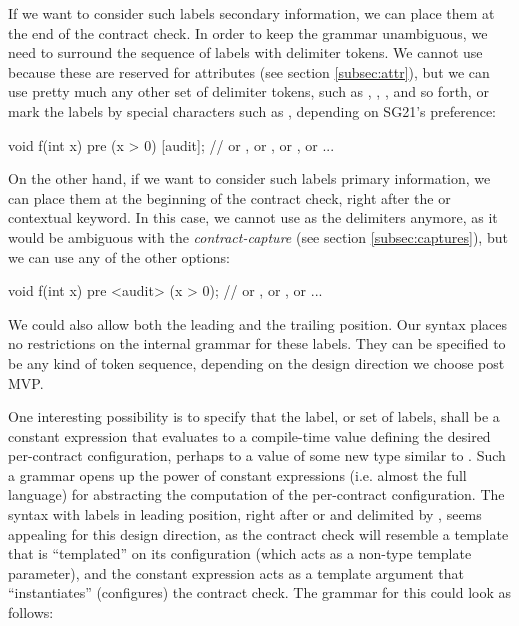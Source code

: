 If we want to consider such labels secondary information, we can place them at the end of the contract check. In order to keep the grammar unambiguous, we need to surround the sequence of labels with delimiter tokens. We cannot use \tcode{[[ ... ]]} because these are reserved for attributes (see section \ref{subsec:attr}), but we can use pretty much any other set of delimiter tokens, such as \mbox{\tcode{[ ...]}}, \mbox{}, \mbox{}, and so forth, or mark the labels by special characters such as , depending on SG21's preference:

\begin{codeblock}
void f(int x)
  pre (x > 0) [audit];   // or , or , or \tcode{[\{audit\}]}, or  ...
\end{codeblock}

On the other hand, if we want to consider such labels primary information, we can place them at the beginning of the contract check, right after the  or  contextual keyword. In this case, we cannot use \mbox{\tcode{[...]}} as the delimiters anymore, as it would be ambiguous with the \emph{contract-capture} (see section \ref{subsec:captures}), but we can use any of the other options:

\begin{codeblock}
void f(int x)
  pre <audit> (x > 0);    // or , or \tcode{[\{audit\}]}, or  ...
\end{codeblock}

We could also allow both the leading and the trailing position. Our syntax places no restrictions on the internal grammar for these labels. They can be specified to be any kind of token sequence, depending on the design direction we choose post MVP.

One interesting possibility is to specify that the label, or set of labels, shall be a constant expression that evaluates to a compile-time value defining the desired per-contract configuration, perhaps to a value of some new type  similar to . Such a grammar opens up the power of constant expressions (i.e. almost the full language) for abstracting the computation of the per-contract configuration. The syntax with labels in leading position, right after  or  and delimited by \mbox{}, seems appealing for this design direction, as the contract check will resemble a template that is ``templated'' on its configuration (which acts as a non-type template parameter), and the constant expression acts as a template argument that ``instantiates'' (configures) the contract check. The grammar for this could look as follows:

